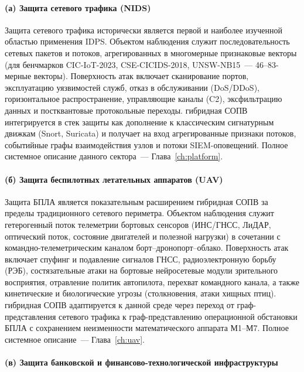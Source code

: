 \paragraph{(а) Защита сетевого трафика (NIDS)}\label{subsubsec:sector_nids}

Защита сетевого трафика исторически является первой и наиболее
изученной областью применения IDPS. Объектом наблюдения служит
последовательность сетевых пакетов и потоков, агрегированных в
многомерные признаковые векторы (для бенчмарков CIC-IoT-2023,
CSE-CICIDS-2018, UNSW-NB15~--- 46--83-мерные векторы). Поверхность
атак включает сканирование портов, эксплуатацию уязвимостей служб,
отказ в обслуживании (DoS/DDoS), горизонтальное распространение,
управляющие каналы (C2), эксфильтрацию данных и постквантовые
протокольные переходы. гибридная СОПВ интегрируется в стек защиты как
дополнение к классическим сигнатурным движкам (Snort, Suricata) и
получает на вход агрегированные признаки потоков, событийные графы
взаимодействия узлов и потоки SIEM-оповещений. Полное системное
описание данного сектора~--- Глава~\ref{ch:platform}.

\paragraph{(б) Защита беспилотных летательных аппаратов (UAV)}\label{subsubsec:sector_uav}

Защита БПЛА является показательным расширением гибридная СОПВ за
пределы традиционного сетевого периметра. Объектом наблюдения служит
гетерогенный поток телеметрии бортовых сенсоров (ИНС/ГНСС, ЛиДАР,
оптический поток, состояние двигателей и полезной нагрузки) в
сочетании с командно-телеметрическим каналом борт--дронопорт--облако.
Поверхность атак включает спуфинг и подавление сигналов ГНСС,
радиоэлектронную борьбу (РЭБ), состязательные атаки на бортовые
нейросетевые модули зрительного восприятия, отравление политик
автопилота, перехват командного канала, а также кинетические и
биологические угрозы (столкновения, атаки хищных птиц). гибридная СОПВ
адаптируется к данной среде через переход от граф-представления
сетевого трафика к граф-представлению операционной обстановки БПЛА с
сохранением неизменности математического аппарата М1--М7. Полное
системное описание~--- Глава~\ref{ch:uav}.

\paragraph{(в) Защита банковской и финансово-технологической инфраструктуры}\label{subsubsec:sector_fintech}


